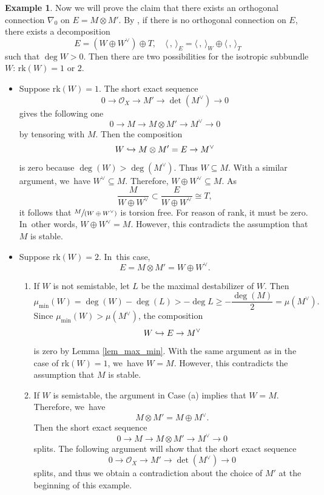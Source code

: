 \documentclass[JEP,XML,SOM,Unicode,published]{cedram}
\newcommand\hto{\mathrel{\lhook\joinrel\to}}
\newcommand{\spfrac}[2]{\sfrac{#1}{(#2)}}
\newcommand{\rk}{\mathrm{rk}}
\theoremstyle{plain}
\theoremstyle{definition}
\newtheorem{examp}[thm]{Example}
\begin{document}
\begin{examp}
Now we will prove the claim that there exists an orthogonal connection $\nabla_0$ on $E = M \otimes M'$. By \cite[Th.\,4.2]{BMW11}, if there is no orthogonal connection on $E$, there exists a decomposition
\[
E= (W \oplus W^{\vee}) \oplus T, \quad \langle \,, \, \rangle_E = \langle \,, \, \rangle_W \oplus \langle \,, \, \rangle_T
\]
such that $\deg W > 0$. Then there are two possibilities for the isotropic subbundle $W$: $\rk(W)=1 \text{ or } 2$.
\begin{itemize}
\item Suppose $\rk(W)=1$. The short exact sequence
\[
0 \to \mathcal{O}_X \to M' \to \det(M^{\vee}) \to 0
\]
gives the following one
\[
0 \to M \to M \otimes M' \to M^{\vee} \to 0
\]
by tensoring with $M$. Then the composition
\[
W \hto M \otimes M' = E \to M^{\vee}
\]
is zero because $\deg(W) > \deg(M^{\vee})$. Thus $W \subseteq M$. With a similar argument, we~have $W^{\vee} \subseteq M$. Therefore, $W \oplus W^{\vee} \subseteq M$. As
\[
\frac{M}{W\oplus W^{\vee}} \subset \frac{E}{W\oplus W^{\vee}}\cong T,
\]
it follows that $ \spfrac{M}{W\oplus W^{\vee}}$ is torsion free. For reason of rank, it must be zero. In~other words, $W \oplus W^{\vee} = M$. However, this contradicts the assumption that $M$ is stable.

\item Suppose $\rk(W)=2$. In~this case,
\[
E = M \otimes M' = W \oplus W^\vee.
\]

\begin{enumerate}
\item[(a)] If $W$ is not semistable, let $L$ be the maximal destabilizer of $W$. Then
\[
\mu_{\min}(W) = \deg(W) - \deg(L) > - \deg L \geq - \frac{\deg(M)}{2} = \mu(M^{\vee}).
\]
Since $\mu_{\min}(W) > \mu(M^{\vee})$, the composition
\[
W \hto E \to M^{\vee}
\]
is zero by Lemma \ref{lem_max_min}. With the same argument as in the case of $\rk(W)=1$, we~have $W=M$. However, this contradicts the assumption that $M$ is stable.

\item[(b)] If $W$ is semistable, the argument in Case (a) implies that $W=M$. Therefore, we~have
\[
M \otimes M' = M \oplus M^{\vee}.
\]
Then the short exact sequence
\[
0 \to M \to M \otimes M' \to M^{\vee} \to 0
\]
splits. The following argument will show that the short exact sequence
\[
0 \to \mathcal{O}_X \to M' \to \det(M^{\vee}) \to 0
\]
splits, and thus we obtain a contradiction about the choice of $M'$ at the beginning of this example.


\end{enumerate}
\end{itemize}
\end{examp}
\end{document}

